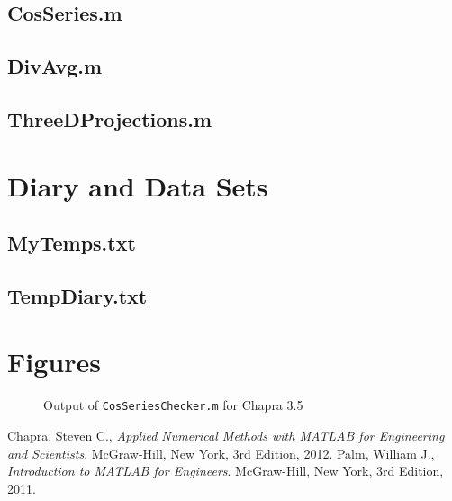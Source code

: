 \documentclass{article}
\begin{document}
\subsection{CosSeries.m}
\subsection{DivAvg.m}
\subsection{ThreeDProjections.m}
\pagebreak

\section{Diary and Data Sets}
\subsection{MyTemps.txt}

\subsection{TempDiary.txt}
\clearpage

\section{Figures}


\begin{figure}[htb!p]
\begin{center}
\end{center}
\end{figure}

\begin{figure}[htb!]
\begin{center}
\caption{Output of {\tt CosSeriesChecker.m} for Chapra 3.5}
\end{center}
\end{figure}


\clearpage

\begin{thebibliography}{9}
  Chapra, Steven C.,
  {\it Applied Numerical Methods with MATLAB for Engineering and Scientists}.
  McGraw-Hill, New York,
  3rd Edition,
  2012.
  Palm, William J.,
  {\it Introduction to MATLAB for Engineers}.
  McGraw-Hill, New York,
  3rd Edition,
  2011.
\end{thebibliography}
\end{document}
